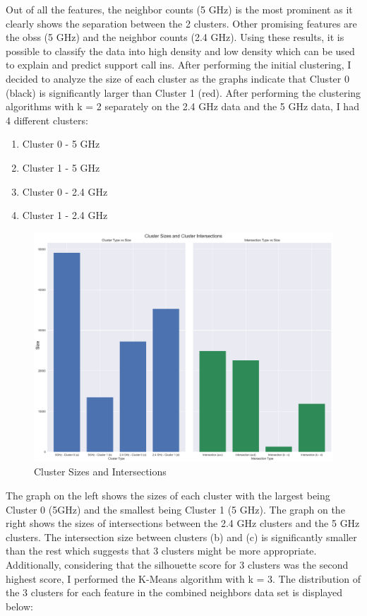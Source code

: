 \documentclass{article}
\begin{document}
\noindent
Out of all the features, the neighbor counts (5 GHz) is the most prominent as it clearly shows the separation between the 2 clusters. Other promising features are the obss (5 GHz) and the neighbor counts (2.4 GHz). Using these results, it is possible to classify the data into high density and low density which can be used to explain and predict support call ins. 
\newpage
\noindent
After performing the initial clustering, I decided to analyze the size of each cluster as the graphs indicate that Cluster 0 (black) is significantly larger than Cluster 1 (red). After performing the clustering algorithms with k = 2 separately on the 2.4 GHz data and the 5 GHz data, I had 4 different clusters:

\begin{enumerate}[label=(\alph*)]
    \item Cluster 0 - 5 GHz
    \item Cluster 1 - 5 GHz
    \item Cluster 0 - 2.4 GHz
    \item Cluster 1 - 2.4 GHz
\end{enumerate}

\begin{figure}[htp]
    \centering
    \includegraphics[width=14cm]{visuals/cluster_sizes_intersections.png}
    \caption{Cluster Sizes and Intersections}
\end{figure}

\noindent
The graph on the left shows the sizes of each cluster with the largest being Cluster 0 (5GHz) and the smallest being Cluster 1 (5 GHz). The graph on the right shows the sizes of intersections between the 2.4 GHz clusters and the 5 GHz clusters. The intersection size between clusters (b) and (c) is significantly smaller than the rest which suggests that 3 clusters might be more appropriate. Additionally, considering that the silhouette score for 3 clusters was the second highest score, I performed the K-Means algorithm with k = 3. The distribution of the 3 clusters for each feature in the combined neighbors data set is displayed below:
\end{document}

